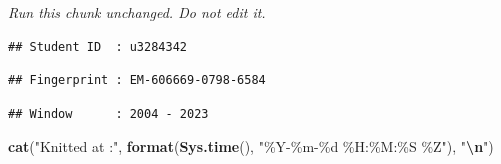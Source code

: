 \documentclass[
]{article}
\newenvironment{Shaded}{\begin{snugshade}}{\end{snugshade}}
\newcommand{\AttributeTok}[1]{\textcolor[rgb]{0.13,0.29,0.53}{#1}}
\newcommand{\FunctionTok}[1]{\textcolor[rgb]{0.13,0.29,0.53}{\textbf{#1}}}
\newcommand{\NormalTok}[1]{#1}
\newcommand{\SpecialCharTok}[1]{\textcolor[rgb]{0.81,0.36,0.00}{\textbf{#1}}}
\newcommand{\StringTok}[1]{\textcolor[rgb]{0.31,0.60,0.02}{#1}}
\begin{document}
\emph{Run this chunk unchanged. Do not edit it.}

\begin{Shaded}
\end{Shaded}

\begin{verbatim}
## Student ID  : u3284342
\end{verbatim}

\begin{Shaded}
\end{Shaded}

\begin{verbatim}
## Fingerprint : EM-606669-0798-6584
\end{verbatim}

\begin{Shaded}
\end{Shaded}

\begin{verbatim}
## Window      : 2004 - 2023
\end{verbatim}

\begin{Shaded}
\begin{Highlighting}[]
\FunctionTok{cat}\NormalTok{(}\StringTok{"Knitted at  :"}\NormalTok{, }\FunctionTok{format}\NormalTok{(}\FunctionTok{Sys.time}\NormalTok{(), }\StringTok{"\%Y{-}\%m{-}\%d \%H:\%M:\%S \%Z"}\NormalTok{), }\StringTok{"}\SpecialCharTok{\textbackslash{}n}\StringTok{"}\NormalTok{)}
\end{Highlighting}
\end{Shaded}
\end{document}
